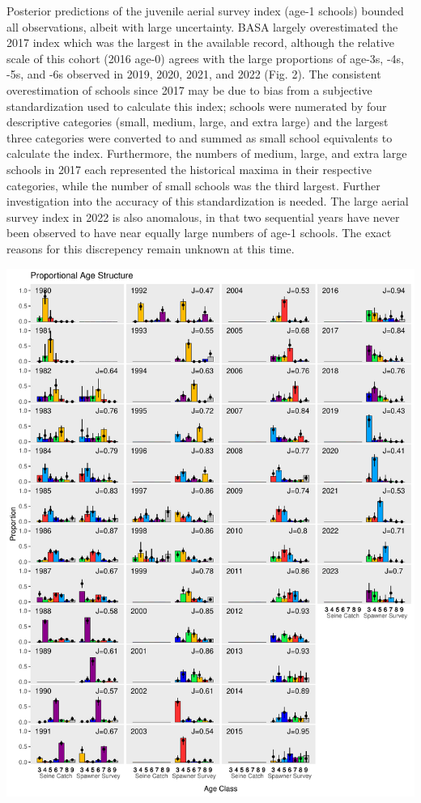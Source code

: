 \documentclass[
  11pt,
]{article}
\begin{document}
Posterior predictions of the juvenile aerial survey index (age-1
schools) bounded all observations, albeit with large uncertainty. BASA
largely overestimated the 2017 index which was the largest in the
available record, although the relative scale of this cohort (2016
age-0) agrees with the large proportions of age-3s, -4s, -5s, and -6s
observed in 2019, 2020, 2021, and 2022 (Fig. 2). The consistent
overestimation of schools since 2017 may be due to bias from a
subjective standardization used to calculate this index; schools were
numerated by four descriptive categories (small, medium, large, and
extra large) and the largest three categories were converted to and
summed as small school equivalents to calculate the index. Furthermore,
the numbers of medium, large, and extra large schools in 2017 each
represented the historical maxima in their respective categories, while
the number of small schools was the third largest. Further investigation
into the accuracy of this standardization is needed. The large aerial
survey index in 2022 is also anomalous, in that two sequential years
have never been observed to have near equally large numbers of age-1
schools. The exact reasons for this discrepency remain unknown at this
time.

\begin{center}\includegraphics[width=0.85\linewidth]{figures/age_compositions} \end{center}
\end{document}
